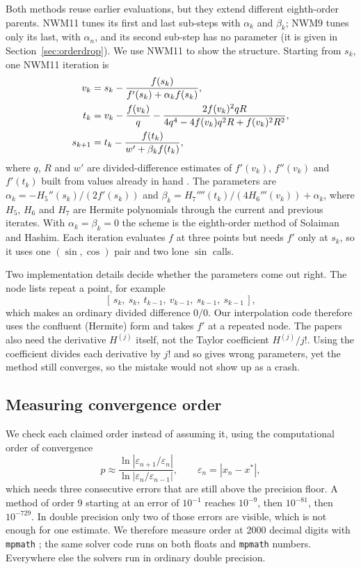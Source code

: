\documentclass[sigconf,nonacm]{acmart}
\begin{document}
Both methods reuse earlier evaluations, but they extend different
eighth-order parents. NWM11 tunes its first and last sub-steps with
$\alpha_k$ and $\beta_k$; NWM9 tunes only its last, with $\alpha_n$, and its
second sub-step has no parameter (it is given in Section~\ref{sec:orderdrop}).
We use NWM11 to show the structure. Starting from $s_k$, one NWM11
iteration is
\begin{align}
v_k     &= s_k - \frac{f(s_k)}{f'(s_k) + \alpha_k f(s_k)}, \label{eq:step1}\\
t_k     &= v_k - \frac{f(v_k)}{q}
           - \frac{2 f(v_k)^2 q R}{4q^4 - 4f(v_k)q^2R + f(v_k)^2R^2}, \notag\\
s_{k+1} &= t_k - \frac{f(t_k)}{w' + \beta_k f(t_k)}, \label{eq:step3}
\end{align}
where $q$, $R$ and $w'$ are divided-difference estimates of $f'(v_k)$,
$f''(v_k)$ and $f'(t_k)$ built from values already in hand
\cite{nwm11}. The parameters are
$\alpha_k = -H_5''(s_k)/(2f'(s_k))$ and
$\beta_k = H_7''''(t_k)/(4H_6'''(v_k)) + \alpha_k$, where $H_5$, $H_6$ and
$H_7$ are Hermite polynomials through the current and previous iterates.
With $\alpha_k = \beta_k = 0$ the scheme is the eighth-order method of
Solaiman and Hashim. Each iteration evaluates $f$ at three points but
needs $f'$ only at $s_k$, so it uses one $(\sin, \cos)$ pair and two lone
$\sin$ calls.

Two implementation details decide whether the parameters come out right.
The node lists repeat a point, for example
\[
[\,s_k,\ s_k,\ t_{k-1},\ v_{k-1},\ s_{k-1},\ s_{k-1}\,],
\]
which makes an ordinary divided difference $0/0$. Our interpolation code therefore uses the
confluent (Hermite) form and takes $f'$ at a repeated node. The papers
also need the derivative $H^{(j)}$ itself, not the Taylor coefficient
$H^{(j)}/j!$. Using the coefficient divides each derivative by $j!$ and
so gives wrong parameters, yet the method still converges, so the mistake would not show up as
a crash.

\subsection{Measuring convergence order}
\label{sec:coc}

We check each claimed order instead of assuming it, using the
computational order of convergence
\begin{equation}
p \approx \frac{\ln|\varepsilon_{n+1}/\varepsilon_{n}|}
               {\ln|\varepsilon_{n}/\varepsilon_{n-1}|},
\qquad \varepsilon_n = |x_n - x^{*}|,
\end{equation}
which needs three consecutive errors that are still above the precision
floor. A method of order 9 starting at an error of $10^{-1}$ reaches
$10^{-9}$, then $10^{-81}$, then $10^{-729}$. In double precision only two
of those errors are visible, which is not enough for one estimate. We
therefore measure order at 2000 decimal digits with \texttt{mpmath}
\cite{mpmath}; the same solver code runs on both floats and
\texttt{mpmath} numbers. Everywhere else the solvers run in ordinary
double precision.
\end{document}
